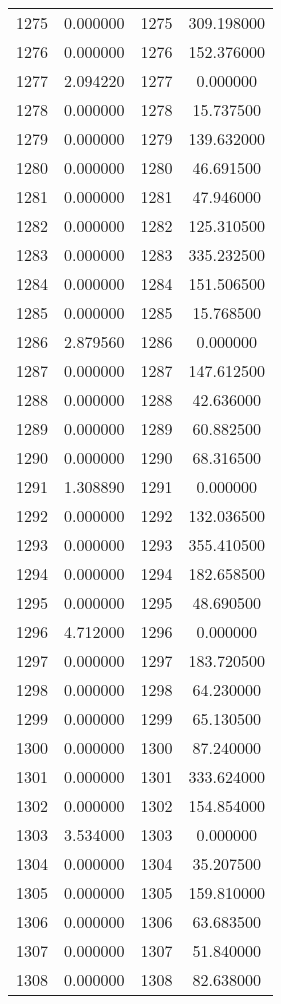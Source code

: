 \documentclass[12pt]{article}
\begin{document}
\begin{longtable}{@{}cccc@{}}
1275 & 0.000000 & 1275 & 309.198000 \\
1276 & 0.000000 & 1276 & 152.376000 \\
1277 & 2.094220 & 1277 & 0.000000 \\
1278 & 0.000000 & 1278 & 15.737500 \\
1279 & 0.000000 & 1279 & 139.632000 \\
1280 & 0.000000 & 1280 & 46.691500 \\
1281 & 0.000000 & 1281 & 47.946000 \\
1282 & 0.000000 & 1282 & 125.310500 \\
1283 & 0.000000 & 1283 & 335.232500 \\
1284 & 0.000000 & 1284 & 151.506500 \\
1285 & 0.000000 & 1285 & 15.768500 \\
1286 & 2.879560 & 1286 & 0.000000 \\
1287 & 0.000000 & 1287 & 147.612500 \\
1288 & 0.000000 & 1288 & 42.636000 \\
1289 & 0.000000 & 1289 & 60.882500 \\
1290 & 0.000000 & 1290 & 68.316500 \\
1291 & 1.308890 & 1291 & 0.000000 \\
1292 & 0.000000 & 1292 & 132.036500 \\
1293 & 0.000000 & 1293 & 355.410500 \\
1294 & 0.000000 & 1294 & 182.658500 \\
1295 & 0.000000 & 1295 & 48.690500 \\
1296 & 4.712000 & 1296 & 0.000000 \\
1297 & 0.000000 & 1297 & 183.720500 \\
1298 & 0.000000 & 1298 & 64.230000 \\
1299 & 0.000000 & 1299 & 65.130500 \\
1300 & 0.000000 & 1300 & 87.240000 \\
1301 & 0.000000 & 1301 & 333.624000 \\
1302 & 0.000000 & 1302 & 154.854000 \\
1303 & 3.534000 & 1303 & 0.000000 \\
1304 & 0.000000 & 1304 & 35.207500 \\
1305 & 0.000000 & 1305 & 159.810000 \\
1306 & 0.000000 & 1306 & 63.683500 \\
1307 & 0.000000 & 1307 & 51.840000 \\
1308 & 0.000000 & 1308 & 82.638000 \\

\end{longtable}
\end{document}

